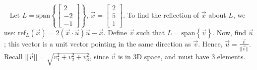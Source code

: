 \documentclass[11pt]{article}
\begin{document}
$\,\,\,$ Let $L=\text{span}\left\lbrace\begin{bmatrix}2\\-2\\-1\end{bmatrix}\right\rbrace$, $\vec{x}=\begin{bmatrix}2\\5\\1\end{bmatrix}$. To find the reflection of $\vec{x}$ about $L$, we use: ref$_L(\vec{x})=2(\vec{x}\cdot\vec{u})\vec{u}-\vec{x}$. Define $\vec{v}$ such that $L=\text{span}\left\lbrace\vec{v}\right\rbrace$. Now, find $\vec{u}$; this vector is a unit vector pointing in the same direction as $\vec{v}$. Hence, $\vec{u}=\frac{\vec{v}}{||\vec{v}||}$. Recall $||\vec{v}||=\sqrt{v_1^2+v_2^2+v_3^2}$, since $\vec{v}$ is in 3D space, and must have 3 elements.
\end{document}
